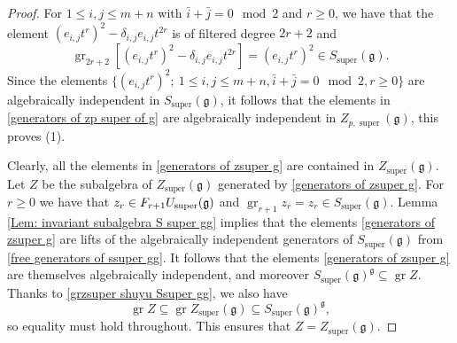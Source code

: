 \documentclass[10pt,a4paper]{amsart}
\DeclareMathOperator{\gr}{gr}
\DeclareMathOperator{\super}{super}
\newcommand{\fg}{\mathfrak{g}}
\begin{document}
\begin{proof}
For $1\leq i,j\leq m+n$ with $\bar i+\bar j=0\!\!\!\mod 2$ and $r\geq 0$,
we have that the element $(e_{i,j}t^r)^2-\delta_{i,j}e_{i,j}t^{2r}$ is of filtered degree $2r+2$
and 
\[
\gr_{2r+2}[(e_{i,j}t^r)^2-\delta_{i,j}e_{i,j}t^{2r}]=(e_{i,j}t^r)^2\in S_{\super}(\fg).
\]
Since the elements $\{(e_{i,j}t^r)^2;~1\leq i,j\leq m+n, \bar i+\bar j=0 \!\!\! \mod 2, r\geq 0\}$ are algebraically independent in $S_{\super}(\fg)$,
it follows that the elements in \eqref{generators of zp super of g} are algebraically independent in $Z_{p,\super}(\fg)$, this proves (1).

Clearly, all the elements in \eqref{generators of zsuper g} are contained in $Z_{\super}(\fg)$.
Let $Z$ be the subalgebra of $Z_{\super}(\fg)$ generated by \eqref{generators of zsuper g}.
For $r\geq 0$ we have that $z_r\in{\rm F}_{r+1}U_{\super}(\fg)$ and $\gr_{r+1}z_r=z_r\in S_{\super}(\fg)$.
Lemma \ref{Lem: invariant subalgebra S super gg} implies that the elements \eqref{generators of zsuper g} are lifts of the algebraically independent generators of $S_{\super}(\fg)$ from \eqref{free generators of ssuper gg}.
It follows that the elements \eqref{generators of zsuper g} are themselves algebraically independent, and moreover $S_{\super}(\fg)^{\fg}\subseteq \gr Z$.
Thanks to \eqref{grzsuper shuyu Ssuper gg},
we also have
\[
\gr Z\subseteq \gr Z_{\super}(\fg)\subseteq S_{\super}(\fg)^{\fg},
\]
so equality must hold throughout.
This ensures that $Z=Z_{\super}(\fg)$.
\end{proof}
\end{document}
